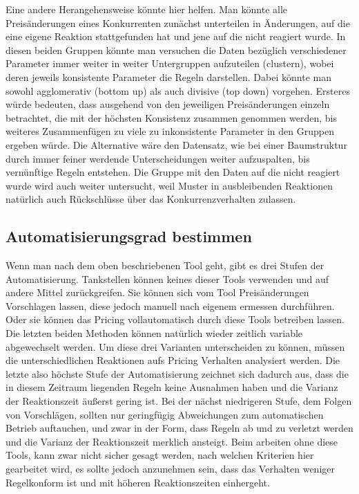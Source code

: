 \documentclass[12pt,a4paper,bibliography=totocnumbered,listof=totocnumbered]{scrartcl}
\begin{document}
Eine andere Herangehensweise könnte hier helfen. Man könnte alle Preisänderungen eines Konkurrenten zunächst unterteilen in Änderungen, auf die eine eigene Reaktion stattgefunden hat und jene auf die nicht reagiert wurde. In diesen beiden Gruppen könnte man versuchen die Daten bezüglich verschiedener Parameter immer weiter in weiter Untergruppen aufzuteilen (clustern), wobei deren jeweils konsistente Parameter die Regeln darstellen. Dabei könnte man sowohl agglomerativ (bottom up) als auch divisive (top down) vorgehen. Ersteres würde bedeuten, dass ausgehend von den jeweiligen Preisänderungen einzeln betrachtet, die mit der höchsten Konsistenz zusammen genommen werden, bis weiteres Zusammenfügen zu viele zu inkonsistente Parameter in den Gruppen ergeben würde. Die Alternative wäre den Datensatz, wie bei einer Baumstruktur durch immer feiner werdende Unterscheidungen weiter aufzuspalten, bis vernünftige Regeln entstehen. Die Gruppe mit den Daten auf die nicht reagiert wurde wird auch weiter untersucht, weil Muster in ausbleibenden Reaktionen natürlich auch Rückschlüsse über das Konkurrenzverhalten zulassen.

\subsection{Automatisierungsgrad bestimmen}

Wenn man nach dem oben beschriebenen Tool geht, gibt es drei Stufen der Automatisierung. Tankstellen können keines dieser Tools verwenden und auf andere Mittel zurückgreifen. Sie können sich vom Tool Preisänderungen Vorschlagen lassen, diese jedoch manuell nach eigenem ermessen durchführen. Oder sie können das Pricing vollautomatisch durch diese Tools betreiben lassen. Die letzten beiden Methoden können natürlich wieder zeitlich variable abgewechselt werden. Um diese drei Varianten unterscheiden zu können, müssen die unterschiedlichen Reaktionen aufs Pricing Verhalten analysiert werden. Die letzte also höchste Stufe der Automatisierung zeichnet sich dadurch aus, dass die in diesem Zeitraum liegenden Regeln keine Ausnahmen haben und die Varianz der Reaktionszeit äußerst gering ist. Bei der nächst niedrigeren Stufe, dem Folgen von Vorschlägen, sollten nur geringfügig Abweichungen zum automatischen Betrieb auftauchen, und zwar in der Form, dass Regeln ab und zu verletzt werden und die Varianz der Reaktionszeit merklich ansteigt. Beim arbeiten ohne diese Tools, kann zwar nicht sicher gesagt werden, nach welchen Kriterien hier gearbeitet wird, es sollte jedoch anzunehmen sein, dass das Verhalten weniger Regelkonform ist und mit höheren Reaktionszeiten einhergeht.
\end{document}
